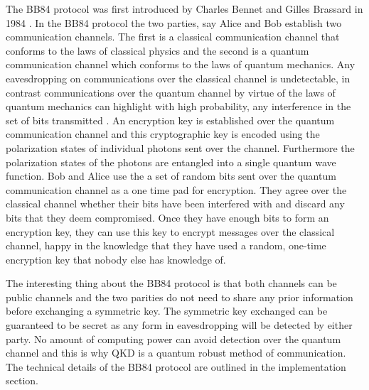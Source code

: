 \documentclass{article}
\begin{document}
The BB84 protocol was first introduced by Charles Bennet and Gilles Brassard in 1984 \cite{Bennett2020QuantumTossing} . In the BB84 protocol the two parties, say Alice and Bob establish two communication channels. The first is a classical communication channel that conforms to the laws of classical physics and the second is a quantum communication channel which conforms to the laws of quantum mechanics. Any eavesdropping on communications over the classical channel is undetectable, in contrast communications over the quantum channel by virtue of the laws of quantum mechanics can highlight with high probability, any interference in the set of bits transmitted . An encryption key is established over the quantum communication channel and this cryptographic key is encoded using the polarization states of individual photons sent over the channel. Furthermore the polarization states of the photons are entangled into a single quantum wave function. Bob and Alice use the a set of random bits sent over the quantum communication channel as a one time pad for encryption. They agree over the classical channel whether their bits have been interfered with and discard any bits that they deem compromised. Once they have enough bits to form an encryption key, they can use this key to encrypt messages over the classical channel, happy in the knowledge that they have used a random, one-time encryption key that nobody else has knowledge of.

The interesting thing about the BB84 protocol is that both channels can be public channels and the two parities do not need to share any prior information before exchanging a symmetric key. The symmetric key exchanged can be guaranteed to be  secret as any form in eavesdropping will be detected by either party. No amount of computing power can avoid detection over the quantum channel and this is why QKD is a quantum robust method of communication. The technical details of the BB84 protocol are outlined in the implementation section.
\end{document}
